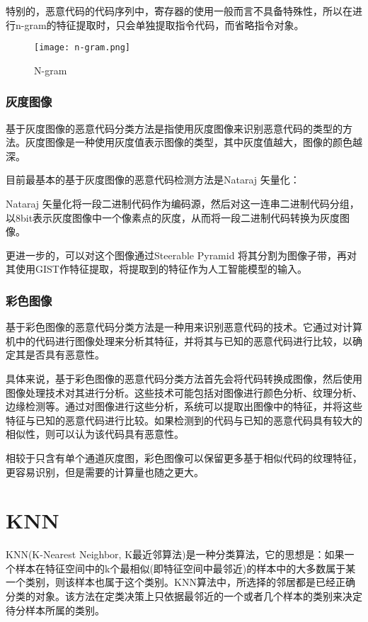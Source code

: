 特别的，恶意代码的代码序列中，寄存器的使用一般而言不具备特殊性，所以在进行n-gram的特征提取时，只会单独提取指令代码，而省略指令对象。\cite{Schultz}
\begin{figure}
  \centering
  \texttt{[image: n-gram.png]}
  \caption{N-gram}
  \label{fig:1}
\end{figure}

\subsubsection{灰度图像}
基于灰度图像的恶意代码分类方法是指使用灰度图像来识别恶意代码的类型的方法。灰度图像是一种使用灰度值表示图像的类型，其中灰度值越大，图像的颜色越深。

目前最基本的基于灰度图像的恶意代码检测方法是Nataraj 矢量化：

Nataraj 矢量化将一段二进制代码作为编码源，然后对这一连串二进制代码分组，以8bit表示灰度图像中一个像素点的灰度，从而将一段二进制代码转换为灰度图像。

更进一步的，可以对这个图像通过Steerable Pyramid 将其分割为图像子带，再对其使用GIST作特征提取，将提取到的特征作为人工智能模型的输入。\cite{natarajMalwareImagesVisualization2011}

\subsubsection{彩色图像}
基于彩色图像的恶意代码分类方法是一种用来识别恶意代码的技术。它通过对计算机中的代码进行图像处理来分析其特征，并将其与已知的恶意代码进行比较，以确定其是否具有恶意性。

具体来说，基于彩色图像的恶意代码分类方法首先会将代码转换成图像，然后使用图像处理技术对其进行分析。这些技术可能包括对图像进行颜色分析、纹理分析、边缘检测等。通过对图像进行这些分析，系统可以提取出图像中的特征，并将这些特征与已知的恶意代码进行比较。如果检测到的代码与已知的恶意代码具有较大的相似性，则可以认为该代码具有恶意性。

相较于只含有单个通道灰度图，彩色图像可以保留更多基于相似代码的纹理特征，更容易识别，但是需要的计算量也随之更大。\cite{yiMaliciousCodeDetection2022}

\section{KNN}
KNN(K-Nearest Neighbor, K最近邻算法)是一种分类算法，它的思想是：如果一个样本在特征空间中的k个最相似(即特征空间中最邻近)的样本中的大多数属于某一个类别，则该样本也属于这个类别。KNN算法中，所选择的邻居都是已经正确分类的对象。该方法在定类决策上只依据最邻近的一个或者几个样本的类别来决定待分样本所属的类别。

